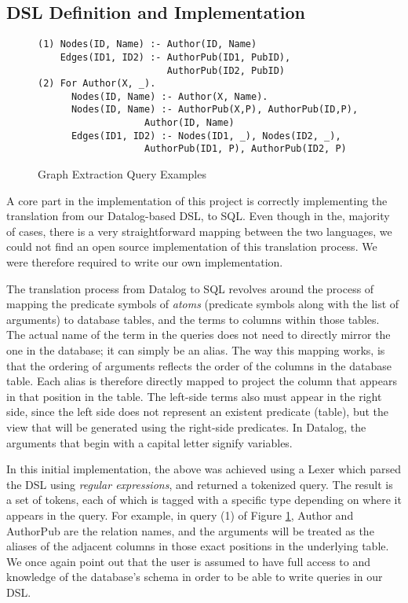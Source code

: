 \documentclass[11pt,letterpaper]{article}
\begin{document}
\subsection*{DSL Definition and Implementation}

\begin{figure}[t]
\scriptsize
\begin{lstlisting}[breaklines,basicstyle=\ttfamily]
(1) Nodes(ID, Name) :- Author(ID, Name)
    Edges(ID1, ID2) :- AuthorPub(ID1, PubID),
                       AuthorPub(ID2, PubID)
(2) For Author(X, _).
      Nodes(ID, Name) :- Author(X, Name).
      Nodes(ID, Name) :- AuthorPub(X,P), AuthorPub(ID,P),
                   Author(ID, Name)
      Edges(ID1, ID2) :- Nodes(ID1, _), Nodes(ID2, _),
                   AuthorPub(ID1, P), AuthorPub(ID2, P)
\end{lstlisting}
\vspace{-10pt}
\caption{Graph Extraction Query Examples}
\vspace{-10pt}
\label{fig:queries}
\end{figure}

A core part in the implementation of this project is correctly implementing the translation from our Datalog-based DSL, to SQL. Even though in the, majority of cases, there is a very straightforward mapping between the two languages, we could not find an open source implementation of this translation process. We were therefore required to write our own implementation.

The translation process from Datalog to SQL revolves around the process of mapping the predicate symbols of \textit{atoms} (predicate symbols along with the list of arguments) to database tables, and the terms to columns within those tables. The actual name of the term in the queries does not need to directly mirror the one in the database; it can simply be an alias. The way this mapping works, is that the ordering of arguments reflects the order of the columns in the database table. Each alias is therefore directly mapped to project the column that appears in that position in the table. The left-side terms also must appear in the right side, since the left side does not represent an existent predicate (table), but the view that will be generated using the right-side predicates. In Datalog, the arguments that begin with a capital letter signify variables.

In this initial implementation, the above was achieved using a Lexer which parsed the DSL using \textit{regular expressions}, and returned a tokenized query. The result is a set of tokens, each of which is tagged with a specific type depending on where it appears in the query. For example, in query (1) of Figure \ref{fig:queries}, Author and AuthorPub are the relation names, and the arguments will be treated as the aliases of the adjacent columns in those exact positions in the underlying table. We once again point out that the user is assumed to have full access to and knowledge of the database's schema in order to be able to write queries in our DSL.
\end{document}
